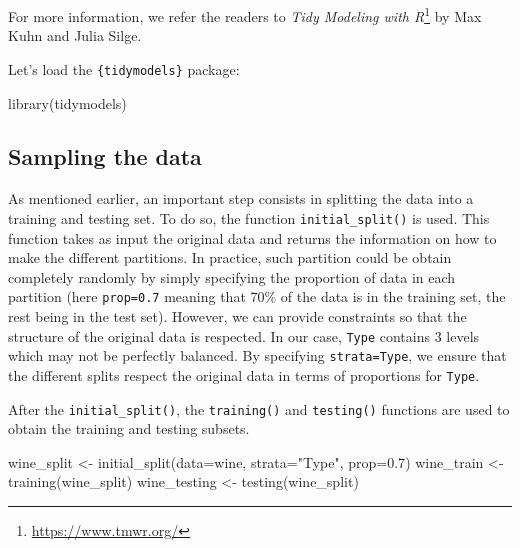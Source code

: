 \documentclass[
]{krantz}
\makeatletter
\newenvironment{Shaded}{\begin{snugshade}}{\end{snugshade}}
\newcommand{\AttributeTok}[1]{\textcolor[rgb]{0.61,0.61,0.61}{#1}}
\newcommand{\FloatTok}[1]{\textcolor[rgb]{0.06,0.06,0.06}{#1}}
\newcommand{\FunctionTok}[1]{\textcolor[rgb]{0,0,0}{#1}}
\newcommand{\NormalTok}[1]{#1}
\newcommand{\OtherTok}[1]{\textcolor[rgb]{0.37,0.37,0.37}{#1}}
\newcommand{\StringTok}[1]{\textcolor[rgb]{0.5,0.5,0.5}{#1}}
\renewcommand{\href}[2]{#2\footnote{\url{#1}}}
\newenvironment{kframe}{%
\medskip{}
\setlength{\fboxsep}{.8em}
 \def\at@end@of@kframe{}%
 \ifinner\ifhmode%
  \def\at@end@of@kframe{\end{minipage}}%
  \begin{minipage}{\columnwidth}%
 \fi\fi%
 \def\FrameCommand##1{\hskip\@totalleftmargin \hskip-\fboxsep
 \colorbox{shadecolor}{##1}\hskip-\fboxsep
     \hskip-\linewidth \hskip-\@totalleftmargin \hskip\columnwidth}%
 \MakeFramed {\advance\hsize-\width
   \@totalleftmargin\z@ \linewidth\hsize
   \@setminipage}}%
 {\par\unskip\endMakeFramed%
 \at@end@of@kframe}
\renewenvironment{Shaded}{\begin{kframe}}{\end{kframe}}
\makeatother
\begin{document}
For more information, we refer the readers to \href{https://www.tmwr.org/}{\emph{Tidy Modeling with R}} by Max Kuhn and Julia Silge.

Let's load the \texttt{\{tidymodels\}} package:

\begin{Shaded}
\begin{Highlighting}[]
\FunctionTok{library}\NormalTok{(tidymodels)}
\end{Highlighting}
\end{Shaded}

\hypertarget{sampling-the-data}{%
\subsection{Sampling the data}\label{sampling-the-data}}

As mentioned earlier, an important step consists in splitting the data into a training and testing set. To do so, the function \texttt{initial\_split()} is used. This function takes as input the original data and returns the information on how to make the different partitions. In practice, such partition could be obtain completely randomly by simply specifying the proportion of data in each partition (here \texttt{prop=0.7} meaning that 70\% of the data is in the training set, the rest being in the test set). However, we can provide constraints so that the structure of the original data is respected. In our case, \texttt{Type} contains 3 levels which may not be perfectly balanced. By specifying \texttt{strata=Type}, we ensure that the different splits respect the original data in terms of proportions for \texttt{Type}.

After the \texttt{initial\_split()}, the \texttt{training()} and \texttt{testing()} functions are used to obtain the training and testing subsets.

\begin{Shaded}
\begin{Highlighting}[]
\NormalTok{wine\_split }\OtherTok{\textless{}{-}} \FunctionTok{initial\_split}\NormalTok{(}\AttributeTok{data=}\NormalTok{wine, }\AttributeTok{strata=}\StringTok{"Type"}\NormalTok{, }\AttributeTok{prop=}\FloatTok{0.7}\NormalTok{)}
\NormalTok{wine\_train }\OtherTok{\textless{}{-}} \FunctionTok{training}\NormalTok{(wine\_split)}
\NormalTok{wine\_testing }\OtherTok{\textless{}{-}} \FunctionTok{testing}\NormalTok{(wine\_split)}
\end{Highlighting}
\end{Shaded}
\end{document}
